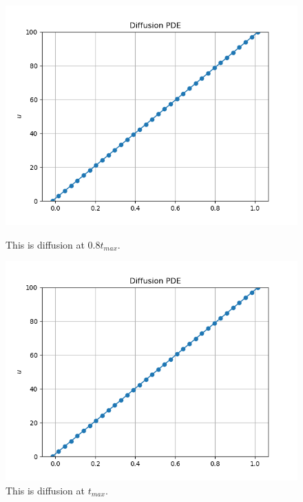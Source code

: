\documentclass[12pt]{article}
\begin{document}
\begin{enumerate}[label=(\alph*)]
\begin{figure}[htb]
\begin{minipage}[c]{0.48\textwidth}
			\label{fig:diff2}
		\end{minipage}
		\newline
		\vspace{-0.2in}
	\end{figure}
	\newpage
	\begin{figure}[htb]
		\centering
		\begin{minipage}[c]{0.48\textwidth}
			\centering
			\includegraphics[width=0.7\linewidth]{./PDE/figures/diffusion_32_upwind/result_diffusion_32_upwind_8.png}
			\caption{This is diffusion at 0.8$t_{max}$.}
			\label{fig:diff3}
		\end{minipage}
		\hspace{0.1in}
		\begin{minipage}[c]{0.48\textwidth}
			\centering
			\includegraphics[width=0.7\linewidth]{./PDE/figures/diffusion_32_upwind/result_diffusion_32_upwind_10.png}
			\caption{This is diffusion at $t_{max}$.}
			\label{fig:diff4}
		\end{minipage}
		\newline
		\vspace{-0.2in}
	\end{figure}
		

\end{enumerate}
\end{document}
